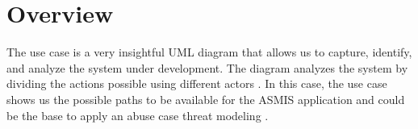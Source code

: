 \section{Overview}
The use case is a very insightful UML diagram that allows us to capture, identify, and analyze the system under development. The diagram analyzes the system by dividing the actions possible using different actors \citep[p.~64]{jacobson2021unified}. In this case, the use case shows us the possible paths to be available for the ASMIS application and could be the base to apply an abuse case threat modeling \citep [p.~59]{usecase_abuse_case}.

